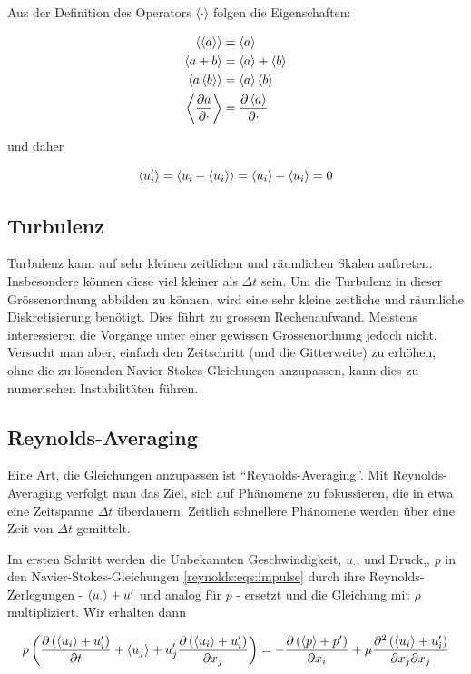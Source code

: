 Aus der Definition des Operators $\langle \cdot \rangle$ folgen die Eigenschaften:

\begin{align}
    \left\langle \left\langle a \right\rangle \right\rangle &= \left\langle a \right\rangle \\
    \left\langle a + b \right\rangle &= \left\langle a \right\rangle + \left\langle b \right\rangle \\
    \left\langle a \left\langle b \right\rangle \right\rangle &= \left\langle a \right\rangle \left\langle b \right\rangle \\
    \left\langle \frac{\partial a}{\partial \cdot} \right\rangle &= \frac{\partial \left\langle a \right\rangle}{\partial \cdot}
\end{align}

und daher

\begin{equation}
    \label{reynolds:eqs:trans-cancel}
    \left\langle u_i' \right\rangle = \left\langle u_i - \left\langle u_i \right\rangle \right\rangle = \left\langle u_i \right\rangle - \left\langle u_i \right\rangle = 0
\end{equation}

\subsection{Turbulenz}

Turbulenz kann auf sehr kleinen zeitlichen und räumlichen Skalen auftreten.
Insbesondere können diese viel kleiner als $\Delta t$ sein. Um die Turbulenz in dieser
Grössenordnung abbilden zu können, wird eine sehr kleine zeitliche und räumliche Diskretisierung
benötigt. Dies führt zu grossem Rechenaufwand. Meistens interessieren die Vorgänge unter
einer gewissen Grössenordnung jedoch nicht. Versucht man aber, einfach den Zeitschritt
(und die Gitterweite) zu erhöhen, ohne die zu lösenden Navier-Stokes-Gleichungen
anzupassen, kann dies zu numerischen Instabilitäten führen.

\subsection{Reynolds-Averaging}
Eine Art, die Gleichungen anzupassen ist ``Reynolds-Averaging''. Mit Reynolds-Averaging verfolgt
man das Ziel, sich auf Phänomene zu fokussieren, die in etwa eine Zeitspanne $\Delta t$ überdauern.
Zeitlich schnellere Phänomene werden über eine Zeit von $\Delta t$ gemittelt.

Im ersten Schritt werden die Unbekannten Geschwindigkeit, $u_\cdot$, und Druck,, $p$ in den Navier-Stokes-Gleichungen
\ref{reynolds:eqs:impulse} durch ihre Reynolds-Zerlegungen - $\left\langle u_\cdot \right\rangle + u_\cdot'$ und analog für $p$ - ersetzt und die Gleichung
mit $\rho$ multipliziert. Wir erhalten dann

\begin{equation}
    \label{reynolds:eqs:der1}
    \rho \left( \frac{\partial \left( \left\langle u_i \right\rangle + u_i' \right)}{\partial t} + \left\langle u_j \right\rangle + u_j' \frac{\partial \left( \left\langle u_i \right\rangle + u_i' \right)}{\partial x_j} \right) =
        - \frac{\partial \left( \left\langle p \right\rangle + p' \right)}{\partial x_i} + 
        \mu \frac{\partial^2 \left( \left\langle u_i \right\rangle + u_i' \right)}{\partial x_j \partial x_j}
\end{equation}

